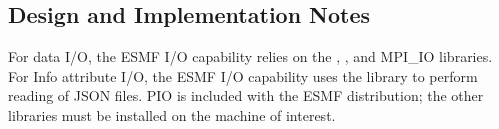 
\subsection{Design and Implementation Notes}

For data I/O, the ESMF I/O capability relies on the
,
, 
and MPI\_IO libraries.  For Info attribute I/O, the ESMF I/O capability uses
the 
library to perform reading of JSON files.  PIO is included with the ESMF
distribution; the other libraries must be installed on the machine of interest.
